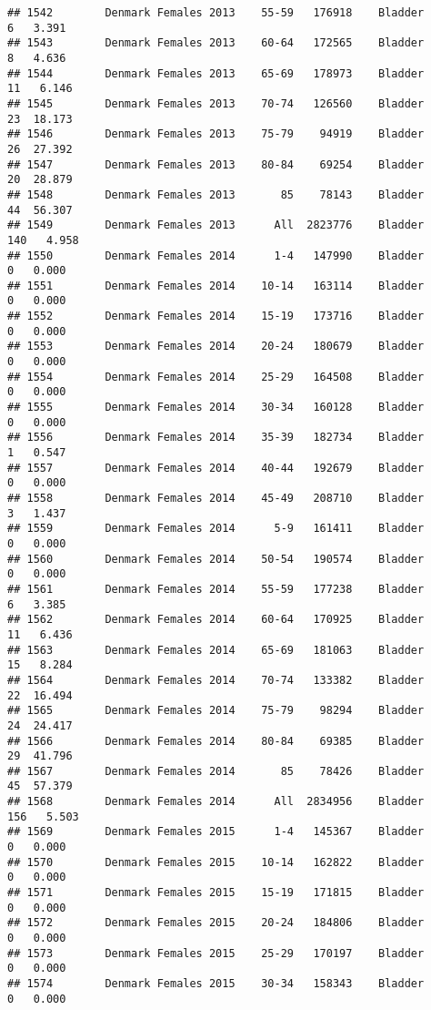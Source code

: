 \documentclass[
]{article}
\begin{document}
\begin{verbatim}
## 1542        Denmark Females 2013    55-59   176918    Bladder      6   3.391
## 1543        Denmark Females 2013    60-64   172565    Bladder      8   4.636
## 1544        Denmark Females 2013    65-69   178973    Bladder     11   6.146
## 1545        Denmark Females 2013    70-74   126560    Bladder     23  18.173
## 1546        Denmark Females 2013    75-79    94919    Bladder     26  27.392
## 1547        Denmark Females 2013    80-84    69254    Bladder     20  28.879
## 1548        Denmark Females 2013       85    78143    Bladder     44  56.307
## 1549        Denmark Females 2013      All  2823776    Bladder    140   4.958
## 1550        Denmark Females 2014      1-4   147990    Bladder      0   0.000
## 1551        Denmark Females 2014    10-14   163114    Bladder      0   0.000
## 1552        Denmark Females 2014    15-19   173716    Bladder      0   0.000
## 1553        Denmark Females 2014    20-24   180679    Bladder      0   0.000
## 1554        Denmark Females 2014    25-29   164508    Bladder      0   0.000
## 1555        Denmark Females 2014    30-34   160128    Bladder      0   0.000
## 1556        Denmark Females 2014    35-39   182734    Bladder      1   0.547
## 1557        Denmark Females 2014    40-44   192679    Bladder      0   0.000
## 1558        Denmark Females 2014    45-49   208710    Bladder      3   1.437
## 1559        Denmark Females 2014      5-9   161411    Bladder      0   0.000
## 1560        Denmark Females 2014    50-54   190574    Bladder      0   0.000
## 1561        Denmark Females 2014    55-59   177238    Bladder      6   3.385
## 1562        Denmark Females 2014    60-64   170925    Bladder     11   6.436
## 1563        Denmark Females 2014    65-69   181063    Bladder     15   8.284
## 1564        Denmark Females 2014    70-74   133382    Bladder     22  16.494
## 1565        Denmark Females 2014    75-79    98294    Bladder     24  24.417
## 1566        Denmark Females 2014    80-84    69385    Bladder     29  41.796
## 1567        Denmark Females 2014       85    78426    Bladder     45  57.379
## 1568        Denmark Females 2014      All  2834956    Bladder    156   5.503
## 1569        Denmark Females 2015      1-4   145367    Bladder      0   0.000
## 1570        Denmark Females 2015    10-14   162822    Bladder      0   0.000
## 1571        Denmark Females 2015    15-19   171815    Bladder      0   0.000
## 1572        Denmark Females 2015    20-24   184806    Bladder      0   0.000
## 1573        Denmark Females 2015    25-29   170197    Bladder      0   0.000
## 1574        Denmark Females 2015    30-34   158343    Bladder      0   0.000

\end{verbatim}
\end{document}
